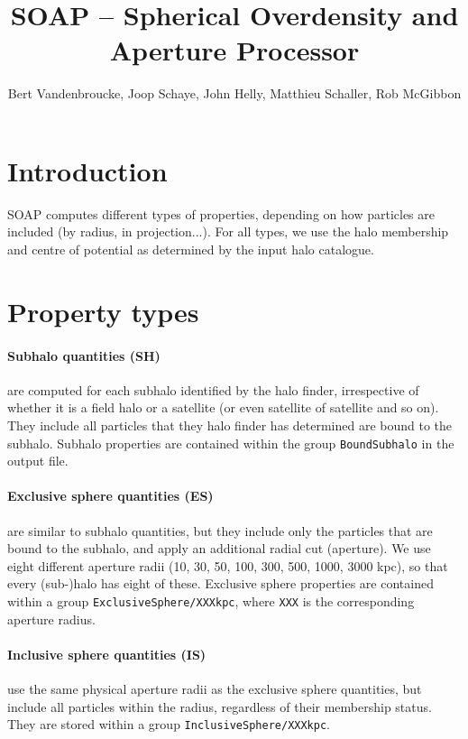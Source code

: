 \documentclass{article}
\title{SOAP -- Spherical Overdensity and Aperture Processor}
\author{Bert Vandenbroucke, Joop Schaye, John Helly, Matthieu Schaller, Rob McGibbon}
\date{}
\begin{document}
\maketitle



\section{Introduction}

SOAP computes different types of properties, depending on  how particles are included (by radius, in projection...). 
For all types, we use the halo membership and centre of potential as determined by the input halo catalogue. 

\section{Property types}

\paragraph{Subhalo quantities (SH)} are computed for each subhalo identified by the halo finder, irrespective of whether 
it is a field halo or a satellite (or even satellite of satellite and so on). They include all particles 
that they halo finder has determined are bound to the subhalo. Subhalo properties are contained within the group 
\verb+BoundSubhalo+ in the output file.

\paragraph{Exclusive sphere quantities (ES)} are similar to subhalo quantities, but they include only the 
particles that are bound to the subhalo, and apply an additional radial cut (aperture). We use eight 
different aperture radii (10, 30, 50, 100, 300, 500, 1000, 3000 kpc), so that every (sub-)halo has eight of 
these. Exclusive sphere properties are contained within a group \verb+ExclusiveSphere/XXXkpc+, where 
\verb+XXX+ is the corresponding aperture radius.

\paragraph{Inclusive sphere quantities (IS)} use the same physical aperture radii as the exclusive sphere 
quantities, but include all particles within the radius, regardless of their membership status. They are
stored within a group \verb+InclusiveSphere/XXXkpc+.
\end{document}

